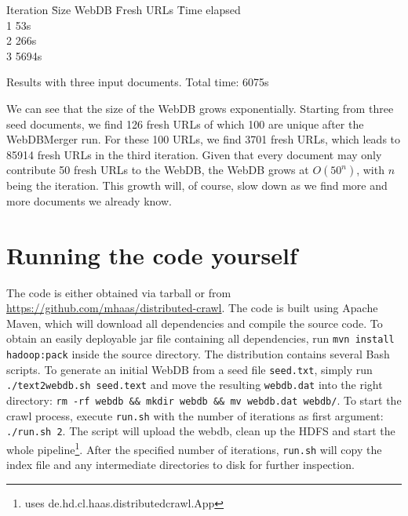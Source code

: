 \documentclass[12pt,a4paper]{report}
\begin{document}
\begin{table}
\label{ResultTable} 
\begin{tabbing}
Iteration \= Size WebDB \= Fresh URLs \= Time elapsed \\
1    \> 53s\\ 
2   \> 266s\\
3   \> 5694s\\

\end{tabbing}
\caption{Results with three input documents. Total time: 6075s}
\end{table}

We can see that the size of the WebDB grows exponentially. Starting from three seed documents, we find 126 fresh URLs of which 100 are unique after the WebDBMerger run.
For these 100 URLs, we find 3701 fresh URLs, which leads to 85914 fresh URLs in the third iteration. Given that every document may only contribute 50 fresh URLs
to the WebDB, the WebDB grows at $O(50^n)$, with $n$ being the iteration. This growth will, of course, slow down as we find more and more documents we already know.

\section{Running the code yourself}
The code is either obtained via tarball or from \url{https://github.com/mhaas/distributed-crawl}. The code is built using Apache Maven, which will download
all dependencies and compile the source code. To obtain an easily deployable jar file containing all dependencies, run \texttt{mvn install hadoop:pack} inside the source directory.
The distribution contains several Bash scripts. To generate an initial WebDB from a seed file \texttt{seed.txt}, simply run \texttt{./text2webdb.sh seed.text} and move the resulting \texttt{webdb.dat} into the right directory: \texttt{rm -rf webdb \&\& mkdir webdb \&\& mv webdb.dat webdb/}.
To start the crawl process, execute \texttt{run.sh} with the number of iterations as first argument: \texttt{./run.sh 2}. The script will upload the webdb,
clean up the HDFS and start the whole pipeline\footnote{uses de.hd.cl.haas.distributedcrawl.App}. After the specified number of iterations, \texttt{run.sh} will copy
the index file and any intermediate directories to disk for further inspection.
\end{document}

